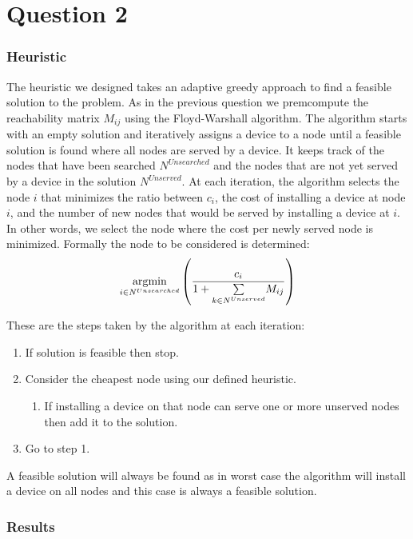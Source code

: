\section{Question 2}

\subsubsection*{Heuristic}

The heuristic we designed takes an adaptive greedy approach to find a feasible solution to the problem.
As in the previous question we premcompute the reachability matrix $M_{ij}$ using the Floyd-Warshall algorithm.
The algorithm starts with an empty solution and iteratively assigns a device to a node until a feasible solution is found where all nodes are served by a device.
It keeps track of the nodes that have been searched $N^{Unsearched}$ and the nodes that are not yet served by a device in the solution $N^{Unserved}$.
At each iteration, the algorithm selects the node $i$ that minimizes the ratio between
$c_i$, the cost of installing a device at node $i$, and the number of new nodes that would be served by installing a device at $i$. In other words, we select the node where the cost per newly served node is minimized.
Formally the node to be considered is determined: 
$$
\underset{i \in N^{Unsearched}}{\arg\!\min} \left( {c_i \over 1 + \underset{k \in N^{Unserved}}\sum M_{ij}} \right)
$$

These are the steps taken by the algorithm at each iteration:
\begin{enumerate}
	\item If solution is feasible then stop.
	\item Consider the cheapest node using our defined heuristic.
	\begin{enumerate}[label*=\arabic*.]
		\item If installing a device on that node can serve one or more unserved nodes then add it to the solution.
	\end{enumerate}
	\item Go to step 1.
\end{enumerate}

A feasible solution will always be found as in worst case the algorithm will install a device on all nodes and this case is always a feasible solution.

\newpage
\subsubsection*{Results}


